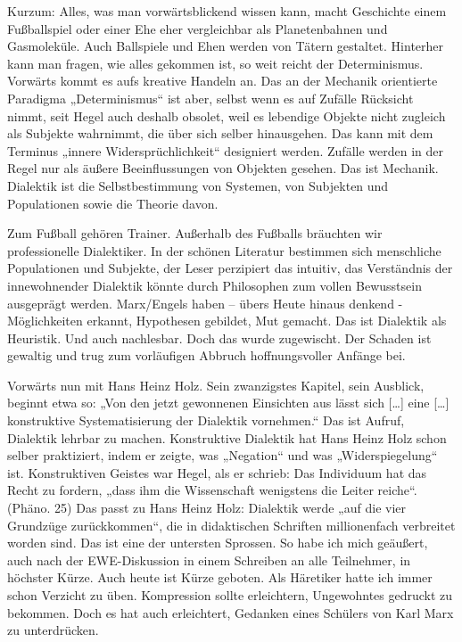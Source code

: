 \documentclass[11pt,a4paper]{article}
\begin{document}
Kurzum: Alles, was man vorwärtsblickend wissen kann, macht Geschichte einem
Fußballspiel oder einer Ehe eher vergleichbar als Planetenbahnen und
Gasmoleküle. Auch Ballspiele und Ehen werden von Tätern gestaltet. Hinterher
kann man fragen, wie alles gekommen ist, so weit reicht der Determinismus.
Vorwärts kommt es aufs kreative Handeln an. Das an der Mechanik orientierte
Paradigma „Determinismus“ ist aber, selbst wenn es auf Zufälle Rücksicht
nimmt, seit Hegel auch deshalb obsolet, weil es lebendige Objekte nicht
zugleich als Subjekte wahrnimmt, die über sich selber hinausgehen. Das kann
mit dem Terminus „innere Widersprüchlichkeit“ designiert werden. Zufälle
werden in der Regel nur als äußere Beeinflussungen von Objekten gesehen. Das
ist Mechanik. Dialektik ist die Selbstbestimmung von Systemen, von Subjekten
und Populationen sowie die Theorie davon.

Zum Fußball gehören Trainer. Außerhalb des Fußballs bräuchten wir
professionelle Dialektiker. In der schönen Literatur bestimmen sich
menschliche Populationen und Subjekte, der Leser perzipiert das intuitiv, das
Verständnis der innewohnender Dialektik könnte durch Philosophen zum vollen
Bewusstsein ausgeprägt werden. Marx/Engels haben – übers Heute hinaus denkend
- Möglichkeiten erkannt, Hypothesen gebildet, Mut gemacht. Das ist Dialektik
als Heuristik. Und auch nachlesbar. Doch das wurde zugewischt. Der Schaden ist
gewaltig und trug zum vorläufigen Abbruch hoffnungsvoller Anfänge bei.

Vorwärts nun mit Hans Heinz Holz. Sein zwanzigstes Kapitel, sein Ausblick,
beginnt etwa so: „Von den jetzt gewonnenen Einsichten aus lässt sich [\ldots]
eine [\ldots] konstruktive Systematisierung der Dialektik vornehmen.“ Das ist
Aufruf, Dialektik lehrbar zu machen. Konstruktive Dialektik hat Hans Heinz
Holz schon selber praktiziert, indem er zeigte, was „Negation“ und was
„Widerspiegelung“ ist. Konstruktiven Geistes war Hegel, als er schrieb: Das
Individuum hat das Recht zu fordern, „dass ihm die Wissenschaft wenigstens die
Leiter reiche“. (Phäno. 25) Das passt zu Hans Heinz Holz: Dialektik werde „auf
die vier Grundzüge zurückkommen“, die in didaktischen Schriften millionenfach
verbreitet worden sind. Das ist eine der untersten Sprossen. So habe ich mich
geäußert, auch nach der EWE-Diskussion in einem Schreiben an alle Teilnehmer,
in höchster Kürze. Auch heute ist Kürze geboten. Als Häretiker hatte ich immer
schon Verzicht zu üben. Kompression sollte erleichtern, Ungewohntes gedruckt
zu bekommen. Doch es hat auch erleichtert, Gedanken eines Schülers von Karl
Marx zu unterdrücken.
\end{document}
